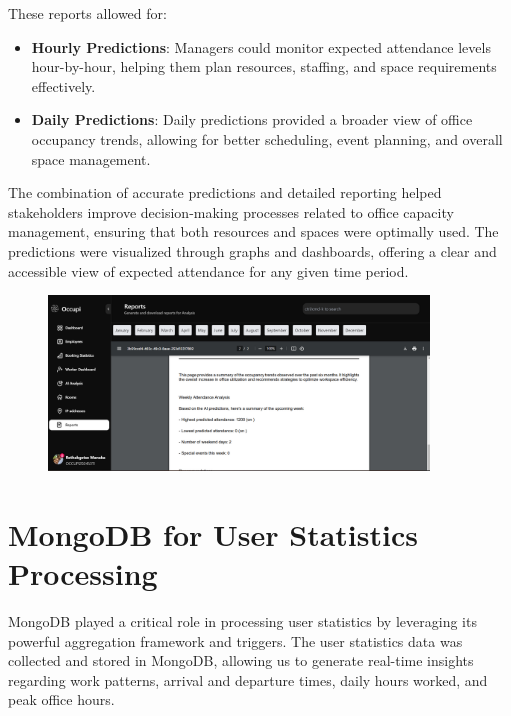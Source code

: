 \documentclass[11pt,a4paper]{article}
\begin{document}
These reports allowed for:
\begin{itemize}
    \item \textbf{Hourly Predictions}: Managers could monitor expected attendance levels hour-by-hour, helping them plan resources, staffing, and space requirements effectively.
    \item \textbf{Daily Predictions}: Daily predictions provided a broader view of office occupancy trends, allowing for better scheduling, event planning, and overall space management.
\end{itemize}

The combination of accurate predictions and detailed reporting helped stakeholders 
improve decision-making processes related to office capacity management, 
ensuring that both resources and spaces were optimally used. The predictions were visualized through graphs and dashboards, 
offering a clear and accessible view of expected attendance for any given time period.

\begin{figure}[htbp]
    \centering
    \includegraphics[width=0.9\textwidth]{Reports.png}
\end{figure}

\section*{MongoDB for User Statistics Processing}

MongoDB played a critical role in processing user statistics by leveraging its powerful aggregation framework and triggers. 
The user statistics data was collected and stored in MongoDB, 
allowing us to generate real-time insights regarding work patterns, arrival and departure times, daily hours worked, and peak office hours.
\end{document}
